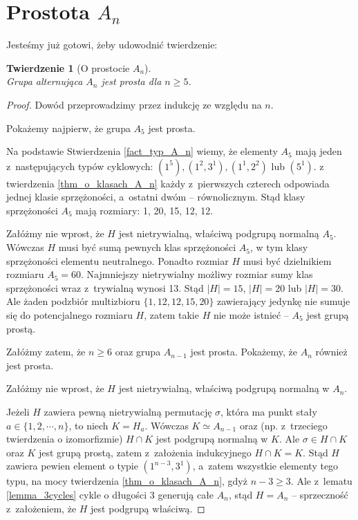 \documentclass[licencjacka]{pracamgr}
\newtheorem{thh}{Twierdzenie}[section]
\begin{document}
\section{Prostota $A_n$}
Jesteśmy już gotowi, żeby udowodnić twierdzenie:

\begin{thh}[O prostocie $A_n$]\label{An_simplicity} $ $ \\
    Grupa alternująca $A_n$ jest prosta dla $n \ge 5$.
\end{thh}
\begin{proof}
    Dowód przeprowadzimy przez indukcję ze względu na $n$.

    Pokażemy najpierw, że grupa $A_5$ jest prosta.

    Na podstawie Stwierdzenia \ref{fact_typ_A_n} wiemy, że elementy $A_5$ mają jeden z~następujących typów cyklowych:
    $(1^5), (1^2, 3^1), (1^1, 2^2)$ lub $(5^1)$.
    z twierdzenia \ref{thm_o_klasach_A_n} każdy z~pierwszych czterech odpowiada jednej klasie sprzężoności, a~ostatni dwóm -- równolicznym.
    Stąd klasy sprzężoności $A_5$ mają rozmiary: 1, 20, 15, 12, 12.

    Załóżmy nie wprost, że $H$ jest nietrywialną, właściwą podgrupą normalną $A_5$.
    Wówczas $H$ musi być sumą pewnych klas sprzężoności $A_5$, w tym klasy sprzężoności elementu neutralnego.
    Ponadto rozmiar $H$ musi być dzielnikiem rozmiaru $A_5 = 60$.
    Najmniejszy nietrywialny możliwy rozmiar sumy klas sprzężoności wraz z~trywialną wynosi 13.
    Stąd $|H| = 15$, $|H| = 20$ lub $|H| = 30$.
    Ale żaden podzbiór multizbioru $\{1, 12, 12, 15, 20 \}$ zawierający jedynkę nie sumuje się do potencjalnego rozmiaru $H$,
    zatem takie $H$ nie może istnieć -- $A_5$ jest grupą prostą.

    Załóżmy zatem, że $n \ge 6$ oraz grupa $A_{n-1}$ jest prosta.
    Pokażemy, że $A_n$ również jest prosta.

    Załóżmy nie wprost, że $H$ jest nietrywialną, właściwą podgrupą normalną w $A_n$.

    Jeżeli $H$ zawiera pewną nietrywialną permutację $\sigma$, która ma punkt stały $a \in \{ 1, 2, \cdots, n \}$, to niech $K = H_a$.
    Wówczas $K \simeq A_{n-1}$ oraz (np. z~trzeciego twierdzenia o izomorfizmie) $H \cap K$ jest podgrupą normalną w $K$.
    Ale $\sigma \in H \cap K$ oraz $K$ jest grupą prostą, zatem z~założenia indukcyjnego $H \cap K = K$.
    Stąd $H$ zawiera pewien element o typie $(1^{n-3}, 3^1)$, a~zatem wszystkie elementy
    tego typu, na mocy twierdzenia \ref{thm_o_klasach_A_n}, gdyż $n-3 \ge 3$.
    Ale z~lematu \ref{lemma_3cycles}    cykle o długości 3 generują całe $A_n$, stąd $H = A_n$ --
    sprzeczność z~założeniem, że $H$ jest podgrupą właściwą.


\end{proof}
\end{document}
